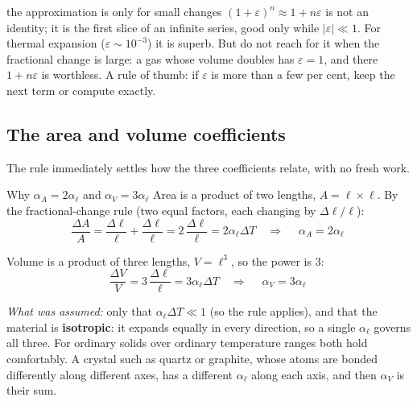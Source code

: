 
\begin{trapbox}{the approximation is only for small changes}
$(1+\varepsilon)^n\approx1+n\varepsilon$ is not an identity; it is the first slice of an infinite
series, good only while $|\varepsilon|\ll1$. For thermal expansion ($\varepsilon\sim10^{-3}$) it is
superb. But do not reach for it when the fractional change is large: a gas whose volume doubles has
$\varepsilon=1$, and there $1+n\varepsilon$ is worthless. A rule of thumb: if $\varepsilon$ is more
than a few per cent, keep the next term or compute exactly.
\end{trapbox}

\subsection{The area and volume coefficients}

The rule immediately settles how the three coefficients relate, with no fresh work.

\begin{derivbox}{Why $\alpha_A = 2\alpha_\ell$ and $\alpha_V = 3\alpha_\ell$}
 Area is a product of two lengths, $A = \ell\times\ell$. By the fractional-change rule
(two equal factors, each changing by $\Delta\ell/\ell$):
\[
\frac{\Delta A}{A} = \frac{\Delta\ell}{\ell} + \frac{\Delta\ell}{\ell}
= 2\,\frac{\Delta\ell}{\ell} = 2\alpha_\ell\Delta T
\quad\Longrightarrow\quad \boxed{\;\alpha_A = 2\alpha_\ell\;}
\]

 Volume is a product of three lengths, $V = \ell^3$, so the power is $3$:
\[
\frac{\Delta V}{V} = 3\,\frac{\Delta\ell}{\ell} = 3\alpha_\ell\Delta T
\quad\Longrightarrow\quad \boxed{\;\alpha_V = 3\alpha_\ell\;}
\]

 \emph{What was assumed:} only that $\alpha_\ell\Delta T \ll 1$ (so the rule applies), and
that the material is \textbf{isotropic}: it expands equally in every direction, so a single
$\alpha_\ell$ governs all three. For ordinary solids over ordinary temperature ranges both hold
comfortably. A crystal such as quartz or graphite, whose atoms are bonded differently along different
axes, has a different $\alpha_\ell$ along each axis, and then $\alpha_V$ is their sum.
\end{derivbox}


